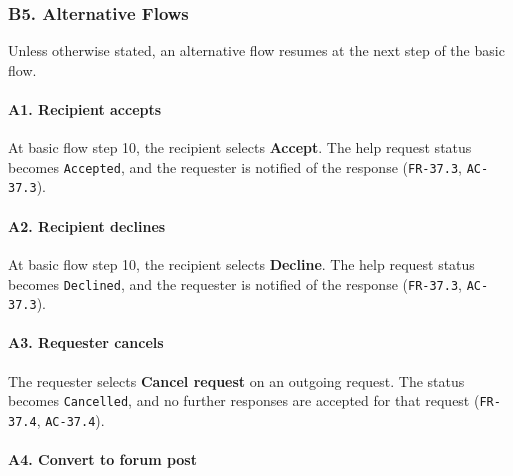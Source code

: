 \documentclass[12pt]{article}
\begin{document}
\hypertarget{sec:b5-alternative-flows}{}
\subsubsection*{B5. Alternative Flows}
\par\medskip

Unless otherwise stated, an alternative flow resumes at the next step of the basic flow.
\par\medskip

\hypertarget{sec:a1-recipient-accepts}{}
\paragraph*{A1. Recipient accepts}
\par\medskip

At basic flow step 10, the recipient selects \textbf{Accept}. The help request status becomes \texttt{Accepted}, and the requester is notified of the response (\texttt{FR-37.3}, \texttt{AC-37.3}).
\par\medskip

\hypertarget{sec:a2-recipient-declines}{}
\paragraph*{A2. Recipient declines}
\par\medskip

At basic flow step 10, the recipient selects \textbf{Decline}. The help request status becomes \texttt{Declined}, and the requester is notified of the response (\texttt{FR-37.3}, \texttt{AC-37.3}).
\par\medskip

\hypertarget{sec:a3-requester-cancels}{}
\paragraph*{A3. Requester cancels}
\par\medskip

The requester selects \textbf{Cancel request} on an outgoing request. The status becomes \texttt{Cancelled}, and no further responses are accepted for that request (\texttt{FR-37.4}, \texttt{AC-37.4}).
\par\medskip

\hypertarget{sec:a4-convert-to-forum-post}{}
\paragraph*{A4. Convert to forum post}
\par\medskip
\end{document}

